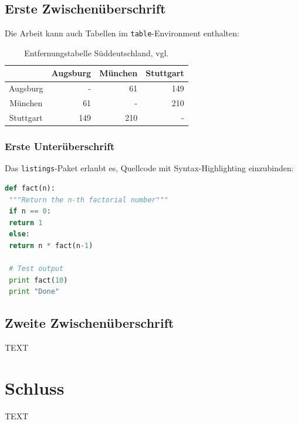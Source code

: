  \section{Erste Zwischenüberschrift}
 \label{sec:ErsteZwischenueberschrift}
 Die Arbeit kann auch Tabellen im \texttt{table}-Environment enthalten:
 \begin{table}[ht]
 	\centering
 	\caption{Entfernungstabelle Süddeutschland, vgl. \cite{entfernungstabelle}}
 	\begin{tabular}{c r r r}
 		\toprule
 		& Augsburg & München & Stuttgart \\
 		\midrule
 		Augsburg  & -        & 61      & 149       \\
 		München   & 61       & -       & 210       \\
 		Stuttgart & 149      & 210     & -         \\
 		\bottomrule
 	\end{tabular}
 	\label{tab:entfernungen}
 \end{table}
 
 \subsection{Erste Unterüberschrift}
 \label{sec:ErsteUnterueberschrift}
 
 Das \texttt{listings}-Paket erlaubt es, Quellcode mit Syntax-Highlighting einzubinden:
 
 \begin{lstlisting}[language=Python,float=ht,caption={Python-Programm zur Berechnung der Fakultätsfunktion}]
 def fact(n):
 """Return the n-th factorial number"""
 if n == 0:
 return 1
 else:
 return n * fact(n-1)
 
 # Test output
 print fact(10)
 print "Done"
 \end{lstlisting}
 \label{lst:factorial}  
 
 \section{Zweite Zwischenüberschrift}
 \label{sec:ZweiteZwischenueberschrift}
 
 TEXT
 
 \chapter{Schluss}
 \label{chp:Schluss}
 
 TEXT
 
 